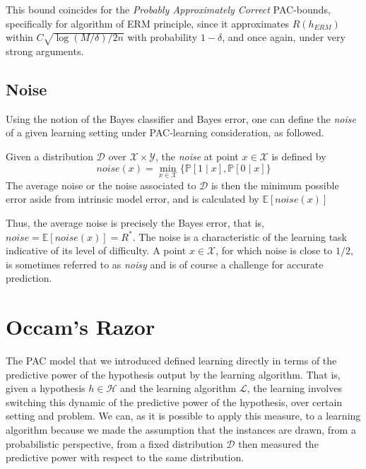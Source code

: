This bound coincides for the \textit{Probably Approximately Correct} PAC-bounds, specifically for algorithm of ERM principle, since it approximates $R(h_{ERM})$ within $C\sqrt{\log{(M/\delta)}/2n}$ with probability $1-\delta$, and once again, under very strong arguments. 
\subsection{Noise}

Using the notion of the Bayes classifier and Bayes error, one can define the \textit{noise}  of a given learning setting under PAC-learning consideration, as followed. 
\begin{definition}[Noise]
    Given a distribution $\mathcal{D}$ over $\mathcal{X}\times \mathcal{Y}$, the \textit{noise} at point $x\in \mathcal{X}$ is defined by \begin{equation*}
        noise(x) = \min_{x\in \mathcal{X}} \{\mathbb{P}[1\mid x], \mathbb{P}[0\mid x]\}
    \end{equation*}
    The average noise or the noise associated to $\mathcal{D}$ is then the minimum possible error aside from intrinsic model error, and is calculated by $\mathbb{E}[noise(x)]$
\end{definition}
Thus, the average noise is precisely the Bayes error, that is, $noise = \mathbb{E}[noise(x)]=R^{*}$. The noise is a characteristic of the learning task indicative of its level of difficulty. A point $x\in \mathcal{X}$, for which noise is close to $1/2$, is sometimes referred to as \textit{noisy} and is of course a challenge for accurate prediction. 

\section{Occam's Razor}

The PAC model that we introduced defined learning directly in terms of the predictive power of the hypothesis output by the learning algorithm. That is, given a hypothesis $h\in \mathcal{H}$ and the learning algorithm $\mathcal{L}$, the learning involves switching this dynamic of the predictive power of the hypothesis, over certain setting and problem. We can, as it is possible to apply this measure, to a learning algorithm because we made the assumption that the instances are drawn, from a probabilistic perspective, from a fixed distribution $\mathcal{D}$ then measured the predictive power with respect to the same distribution. 

